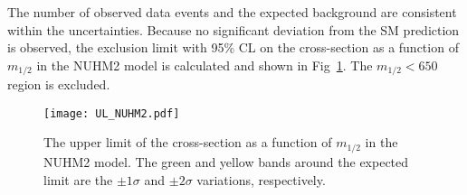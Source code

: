 %
The number of observed data events and the expected background are consistent within the uncertainties.
Because no significant deviation from the SM prediction is observed, the exclusion limit with 95\% CL on the cross-section as a function of $m_{1/2}$ in the NUHM2 model is calculated and shown in Fig~\ref{tab:app_ss3l_nuhm2_exclusion_plot}.
The $m_{1/2} < 650$~{\GeV} region is excluded.

\begin{figure}[htbp]
    \begin{center}        
        \texttt{[image: UL\_NUHM2.pdf]}
    \end{center}
    \caption{The upper limit of the cross-section as a function of $m_{1/2}$ in the NUHM2 model.
    The green and yellow bands around the expected limit are the $\pm 1 \sigma$ and $\pm 2 \sigma$ variations, respectively.}
    \label{tab:app_ss3l_nuhm2_exclusion_plot}
\end{figure}

